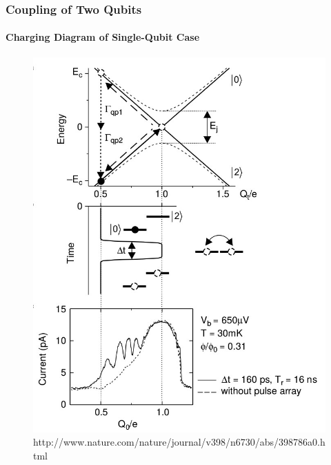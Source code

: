 \documentclass{beamer}
\begin{document}
\begin{frame}
    \frametitle{Coupling of Two Qubits}
    \framesubtitle{Charging Diagram of Single-Qubit Case}
    \begin{figure}[ht!]
        \centering
        \includegraphics[height=0.6\textheight]{img/single-qubit-band-diagram.jpg}
        \caption{http://www.nature.com/nature/journal/v398/n6730/abs/398786a0.html}
    \end{figure}
\end{frame}

\end{document}
